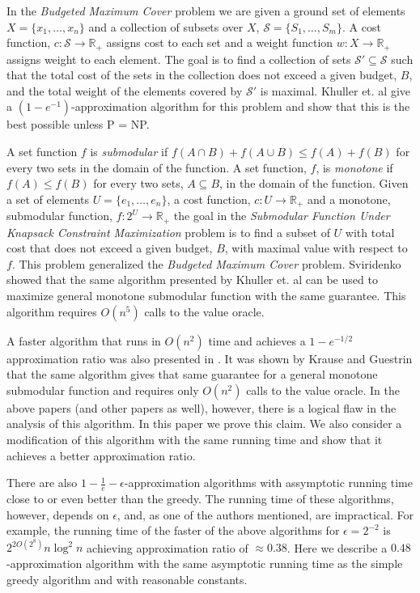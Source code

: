 In the \emph{Budgeted Maximum Cover} problem we are given a ground set of elements 
$X = \{x_1, \dots, x_n\}$ and a collection of subsets over $X$, 
$\mathcal{S} = \{S_1, \dots, S_m\}$.
A cost function, $c:\mathcal{S} \to \mathbb{R}_+$ assigns cost to each set 
and a weight function $w:X \to \mathbb{R}_+$ assigns weight to each element. 
The goal is to find a collection of sets $\mathcal{S'} \subseteq \mathcal{S}$ such that the 
total cost of the sets in the collection does not exceed a given budget, $B$, and the 
total weight of the elements covered by $\mathcal{S'}$ is maximal.
Khuller et. al \cite{khuller1999budgeted} 
give a $(1-e^{-1})$-approximation algorithm for this problem and show that this
is the best possible unless P = NP.   

A set function $f$ is \emph{submodular} if $f(A \cap B) + f(A \cup B) \leq f(A) + f(B)$ 
for every two sets in the domain of the function. A set function, $f$, is \emph{monotone} if 
$f(A) \leq f(B)$ for every two sets, $A \subseteq B$, in the domain of the function.
Given a set of elements $U = \{e_1, \dots, e_n\}$, a cost function, 
$c:U \to \mathbb{R}_+$ and a monotone, submodular function, $f:2^U \to \mathbb{R}_+$ 
the goal in the \emph{Submodular Function Under
Knapsack Constraint Maximization} problem is to find a subset of $U$ with total cost that does not exceed
a given budget, $B$, with maximal value with respect to $f$.
This problem generalized the \emph{Budgeted Maximum Cover} problem. 
Sviridenko \cite{sviridenko2004note} showed that the same algorithm presented by 
Khuller et. al can be used to maximize general monotone submodular function 
with the same guarantee.
This algorithm requires $O(n^5)$ calls to the value oracle. 

A faster algorithm that runs in $O(n^2)$ time and achieves a $1 - e^{-1/2}$ approximation ratio
was also presented in \cite{khuller1999budgeted}. 
It was shown by Krause and Guestrin \cite{krause2005note} that the same algorithm 
gives that same guarantee for a general monotone submodular function and requires only 
$O(n^2)$ calls to the value oracle.
In the above papers (and other papers as well), however, 
there is a logical flaw in the analysis of this algorithm. 
In this paper we prove this claim. 
We also consider a modification of this algorithm with the same running time and show that it
achieves a better approximation ratio.   

There are also $1 - \frac{1}{e} - \epsilon$-approximation algorithms
\cite{Alina2017, badanidiyuru2014fast} with assymptotic running time 
close to or even better than the greedy. 
The running time of these algorithms, however, depends on $\epsilon$, and, 
as one of the authors mentioned, are impractical. 
For example, the running time of the faster of the above algorithms for $\epsilon = 2^{-2}$ is
$2^{2O(2^{8})}n\log^2n$ achieving approximation ratio of $\approx 0.38$.
Here we describe a $0.48$-approximation algorithm with the same 
asymptotic running time as the simple greedy algorithm and with reasonable constants.
